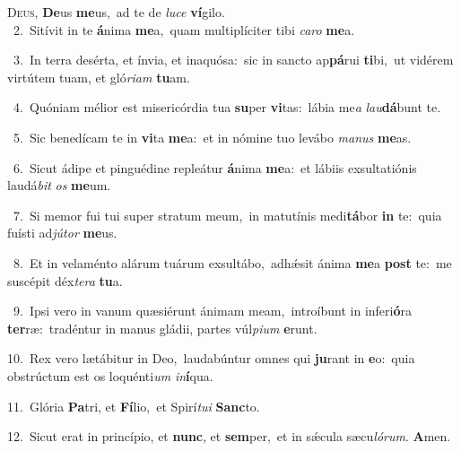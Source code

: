 \lettrine{\initial\textcolor{\initialcolor}{D}}{eus,} \textbf{De}\-us \textbf{me}\-us,~\star ad te de \textit{lu}\-\textit{ce} \textbf{ví}\-gilo.\\
{\numbfont\textcolor{\numbcolor}{~2.}}~Sitívit in te \textbf{á}\-nima \textbf{me}\-a,~\star quam multiplíciter tibi \textit{ca}\-\textit{ro} \textbf{me}\-a.\par
{\numbfont\textcolor{\numbcolor}{~3.}}~In terra desérta, et ínvia, et inaquósa:~\dagger sic in sancto ap\-\textbf{pá}\-rui \textbf{ti}\-bi,~\star ut vidérem virtútem tuam, et gló\-\textit{ri}\-\textit{am} \textbf{tu}\-am.\par
{\numbfont\textcolor{\numbcolor}{~4.}}~Quóniam mélior est misericórdia tua \textbf{su}\-per \textbf{vi}\-tas:~\star lábia me\textit{a} \textit{lau}\-\textbf{dá}bunt te.\par
{\numbfont\textcolor{\numbcolor}{~5.}}~Sic benedícam te in \textbf{vi}\-ta \textbf{me}\-a:~\star et in nómine tuo levábo \textit{ma}\-\textit{nus} \textbf{me}\-as.\par
{\numbfont\textcolor{\numbcolor}{~6.}}~Sicut ádipe et pinguédine repleátur \textbf{á}\-nima \textbf{me}\-a:~\star et lábiis exsultatiónis laudá\textit{bit} \textit{os} \textbf{me}\-um.\par
{\numbfont\textcolor{\numbcolor}{~7.}}~Si memor fui tui super stratum meum,~\dagger in matutínis medi\-\textbf{tá}\-bor \textbf{in} te:~\star quia fuísti ad\-\textit{jú}\-\textit{tor} \textbf{me}\-us.\par
{\numbfont\textcolor{\numbcolor}{~8.}}~Et in velaménto alárum tuárum exsultábo,~\dagger adhǽsit ánima \textbf{me}\-a \textbf{post} te:~\star me suscépit déx\-\textit{te}\-\textit{ra} \textbf{tu}\-a.\par
{\numbfont\textcolor{\numbcolor}{~9.}}~Ipsi vero in vanum quæsiérunt ánimam meam,~\dagger introíbunt in inferi\-\textbf{ó}\-ra \textbf{ter}\-ræ:~\star tradéntur in manus gládii, partes vúl\-\textit{pi}\-\textit{um} \textbf{e}\-runt.\par
{\numbfont\textcolor{\numbcolor}{10.}}~Rex vero lætábitur in Deo,~\dagger laudabúntur omnes qui \textbf{ju}\-rant in \textbf{e}\-o:~\star quia obstrúctum est os loquénti\textit{um} \textit{in}\-\textbf{í}qua.\par
{\numbfont\textcolor{\numbcolor}{11.}}~Glória \textbf{Pa}\-tri, et \textbf{Fí}\-lio,~\star et Spirí\-\textit{tu}\-\textit{i} \textbf{Sanc}\-to.\par
{\numbfont\textcolor{\numbcolor}{12.}}~Sicut erat in princípio, et \textbf{nunc}\-, et \textbf{sem}\-per,~\star et in sǽcula sæcu\-\textit{ló}\-\textit{rum}. \textbf{A}\-men.\par
